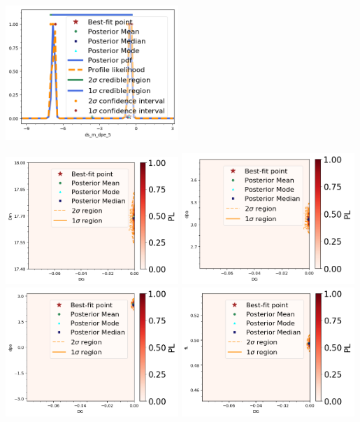 \begin{center}
\includegraphics[width=0.49\textwidth]{figs/ds_m_dpe_5.png}\\
\label{fig:phisMN1D}
\end{center}

\begin{center}
\includegraphics[width=0.49\textwidth]{figs/DG_vs_Dm.png}
\includegraphics[width=0.49\textwidth]{figs/DG_vs_dpa.png}\\
\includegraphics[width=0.49\textwidth]{figs/DG_vs_dpe.png}
\includegraphics[width=0.49\textwidth]{figs/DG_vs_fL.png}\\

\end{center}
